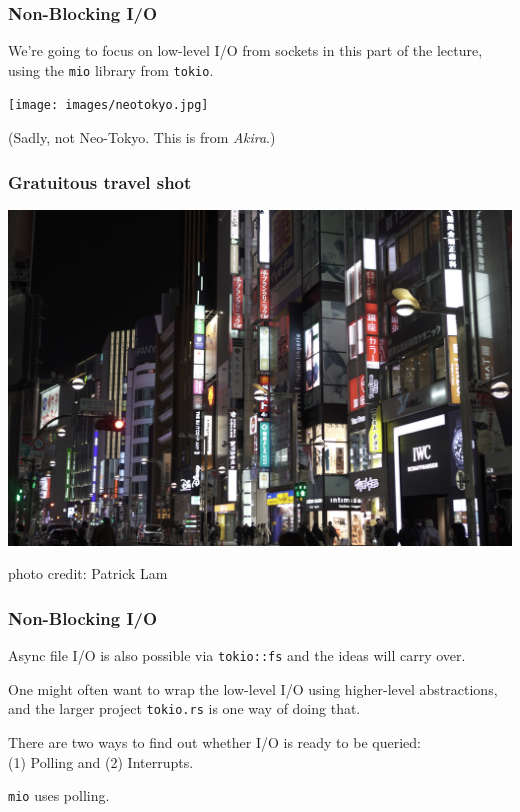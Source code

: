 \begin{frame}
\frametitle{Non-Blocking I/O}

We're going to focus on low-level I/O from sockets in this part of the lecture,
using the \texttt{mio} library from \texttt{tokio}. 

\begin{center}
	\texttt{[image: images/neotokyo.jpg]}
\end{center}

(Sadly, not Neo-Tokyo. This is from \textit{Akira}.)

\end{frame}

\begin{frame}
\frametitle{Gratuitous travel shot}

\begin{center}
	\includegraphics[width=.95\textwidth]{images/08257_shinjuku.jpg}
\end{center}
photo credit: Patrick Lam

\end{frame}

\begin{frame}
\frametitle{Non-Blocking I/O}




Async file I/O is
also possible via \texttt{tokio::fs} and the ideas will carry over.


One might often want to wrap the low-level I/O using higher-level
abstractions, and the larger project \texttt{tokio.rs} is one way of
doing that.


There are two ways to find out whether I/O is ready to be queried:\\
\quad (1) Polling and (2) Interrupts.

\texttt{mio} uses polling.

\end{frame}


